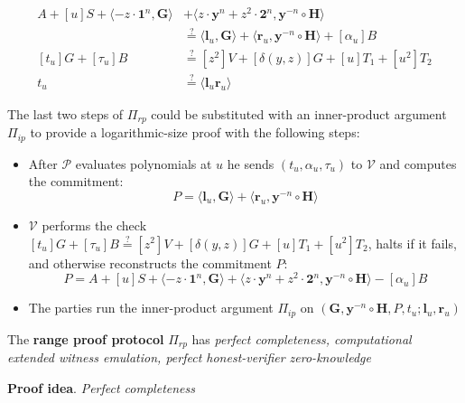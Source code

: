 \documentclass[../lecture-notes-148x210.tex]{subfiles}
\begin{document}
\begin{definition}
\begin{itemize}
            \begin{equation}
                \begin{aligned}
                    A + [u]S + \langle -z \cdot \mathbf{1}^n, \mathbf{G} \rangle &+ \langle z \cdot \mathbf{y}^n + z^2 \cdot \mathbf{2}^n, \mathbf{y}^{-n} \circ \mathbf{H} \rangle \\
                    &\stackrel{\text{?}}{=} \langle \mathbf{l}_u, \mathbf{G} \rangle + \langle \mathbf{r}_u, \mathbf{y}^{-n} \circ \mathbf{H} \rangle + [\alpha_u]B \\
                    [t_u]G + [\tau_u]B &\stackrel{\text{?}}{=} [z^2]V + [\delta(y,z)]G + [u]T_1 + [u^2]T_2 \\
                    t_u &\stackrel{\text{?}}{=} \langle \mathbf{l}_u \mathbf{r}_u \rangle
                \end{aligned}
            \end{equation}
    \end{itemize}
\end{definition}

\begin{remark}
    The last two steps of $\Pi_{rp}$ could be substituted with an inner-product argument $\Pi_{ip}$ to provide a logarithmic-size proof with the following steps:
    \begin{itemize}
        \item After $\mathcal{P}$ evaluates polynomials at $u$ he sends $(t_u, \alpha_u, \tau_u)$ to $\mathcal{V}$ and computes the commitment:
        $$P = \langle \mathbf{l}_u, \mathbf{G} \rangle + \langle \mathbf{r}_u, \mathbf{y}^{-n} \circ \mathbf{H} \rangle$$
        \item $\mathcal{V}$ performs the check $[t_u]G + [\tau_u]B \stackrel{\text{?}}{=} [z^2]V + [\delta(y,z)]G + [u]T_1 + [u^2]T_2$, halts if it fails, and otherwise reconstructs the commitment $P$:
        $$P = A + [u]S + \langle -z \cdot \mathbf{1}^n, \mathbf{G} \rangle + \langle z \cdot \mathbf{y}^n + z^2 \cdot \mathbf{2}^n, \mathbf{y}^{-n} \circ \mathbf{H} \rangle - [\alpha_u]B$$
        \item The parties run the inner-product argument $\Pi_{ip}$ on $(\mathbf{G},\mathbf{y}^{-n} \circ \mathbf{H}, P, t_u; \mathbf{l}_u, \mathbf{r}_u)$
    \end{itemize}
\end{remark}

\begin{theorem}
    The \textbf{range proof protocol} $\Pi_{rp}$ has \textit{perfect completeness, computational extended witness emulation, perfect honest-verifier zero-knowledge}
    \label{th:range_proof}
\end{theorem}
\textbf{Proof idea}. \textit{Perfect completeness} 
\end{document}
